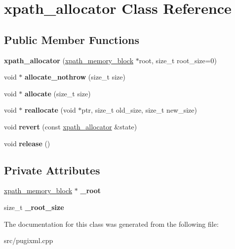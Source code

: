 \hypertarget{classxpath__allocator}{}\section{xpath\+\_\+allocator Class Reference}
\label{classxpath__allocator}
\subsection*{Public Member Functions}
\begin{DoxyCompactItemize}
\item 
\mbox{\label{classxpath__allocator_a3b8ba1722fba115d05949d8f592080e8}} 
{\bfseries xpath\+\_\+allocator} (\hyperlink{structxpath__memory__block}{xpath\+\_\+memory\+\_\+block} $\ast$root, size\+\_\+t root\+\_\+size=0)
\item 
\mbox{\label{classxpath__allocator_aa66f3703548657eca5316392a2d79d00}} 
void $\ast$ {\bfseries allocate\+\_\+nothrow} (size\+\_\+t size)
\item 
\mbox{\label{classxpath__allocator_aad95aa445f2fdc7c3d1c19b1f3d67cb1}} 
void $\ast$ {\bfseries allocate} (size\+\_\+t size)
\item 
\mbox{\label{classxpath__allocator_a4dd502389202ec8e7420832112a571e5}} 
void $\ast$ {\bfseries reallocate} (void $\ast$ptr, size\+\_\+t old\+\_\+size, size\+\_\+t new\+\_\+size)
\item 
\mbox{\label{classxpath__allocator_af1c3ec117935d4488bbd16adf807fbc1}} 
void {\bfseries revert} (const \hyperlink{classxpath__allocator}{xpath\+\_\+allocator} \&state)
\item 
\mbox{\label{classxpath__allocator_a9436b8bdef3e0e0ff0df28c2af6a430d}} 
void {\bfseries release} ()
\end{DoxyCompactItemize}
\subsection*{Private Attributes}
\begin{DoxyCompactItemize}
\item 
\mbox{\label{classxpath__allocator_ace647e1e57dd658b4bbcd3b18fb567f1}} 
\hyperlink{structxpath__memory__block}{xpath\+\_\+memory\+\_\+block} $\ast$ {\bfseries \+\_\+root}
\item 
\mbox{\label{classxpath__allocator_adc703a6c3f3a0435f8b5f2e6c770b3fe}} 
size\+\_\+t {\bfseries \+\_\+root\+\_\+size}
\end{DoxyCompactItemize}


The documentation for this class was generated from the following file\+:\begin{DoxyCompactItemize}
\item 
src/pugixml.\+cpp\end{DoxyCompactItemize}
